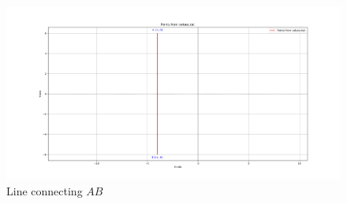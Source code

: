 \documentclass[journal]{IEEEtran}
\begin{document}
\begin{figure}[h!]
   \centering
   \includegraphics[width=0.7\linewidth]{figs/Figure_1.png}
   \caption{Line connecting $AB$}
   \label{stemplot}
\end{figure}
	
\end{document}
